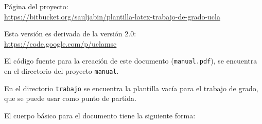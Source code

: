 \introduccion


\noindent
Página del proyecto: \\ {\footnotesize \url{https://bitbucket.org/sauljabin/plantilla-latex-trabajo-de-grado-ucla}}

\noindent
Esta versión es derivada de la versión 2.0: \\ {\footnotesize \url{https://code.google.com/p/uclamsc}}

El código fuente para la creación de este documento (\texttt{manual.pdf}), se encuentra en el directorio del proyecto \texttt{manual}.

En el directorio \texttt{trabajo} se encuentra la plantilla vacía para el trabajo de grado, que se puede usar como punto de partida.

El cuerpo básico para el documento tiene la siguiente forma:


